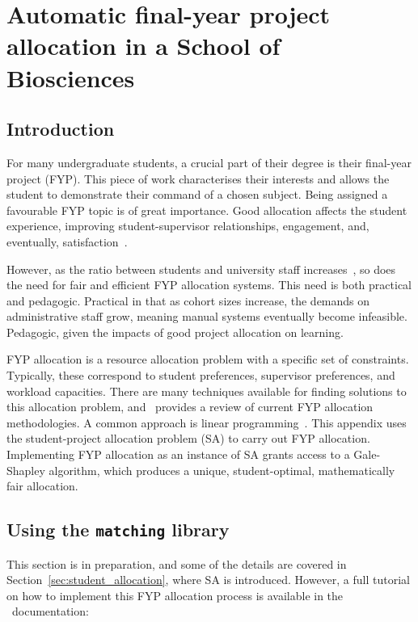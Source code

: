 \chapter{Automatic final-year project allocation in a School of Biosciences}
\label{app:biosci}

\section{Introduction}

For many undergraduate students, a crucial part of their degree is their
final-year project (FYP). This piece of work characterises their interests and
allows the student to demonstrate their command of a chosen subject. Being
assigned a favourable FYP topic is of great importance. Good allocation affects
the student experience, improving student-supervisor relationships, engagement,
and, eventually, satisfaction~\cite{Briffa2018,Kuh2009}.

However, as the ratio between students and university staff
increases~\cite{McDonald2013}, so does the need for fair and efficient FYP
allocation systems. This need is both practical and pedagogic. Practical in that
as cohort sizes increase, the demands on administrative staff grow, meaning
manual systems eventually become infeasible. Pedagogic, given the impacts of
good project allocation on learning.

FYP allocation is a resource allocation problem with a specific set of
constraints. Typically, these correspond to student preferences, supervisor
preferences, and workload capacities. There are many techniques available for
finding solutions to this allocation problem, and~\cite{Hussain2019} provides a
review of current FYP allocation methodologies. A common approach is linear
programming~\cite{Chiarandini2017,Kwanashie2015}. This appendix uses the
student-project allocation problem (SA) to carry out FYP allocation.
Implementing FYP allocation as an instance of SA grants access to a Gale-Shapley
algorithm, which produces a unique, student-optimal, mathematically fair
allocation.


\section{Using the {\color{grey}\texttt{matching}} library}
\label{sec:matching}

This section is in preparation, and some of the details are covered in
Section~\ref{sec:student_allocation}, where SA is introduced. However, a full
tutorial on how to implement this FYP allocation process is available in the
\matching\ documentation:

